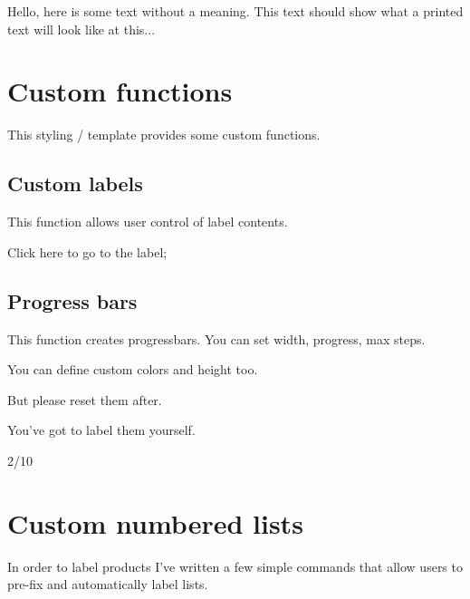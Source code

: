 \documentclass{report}
\begin{document}
	Hello,  here  is  some  text  without  a  meaning.   This  text  should
	show what a printed text will look like at this...
	
	\section{Custom functions}
	This styling / template provides some custom functions. 
	
	\subsection{Custom labels}
	This function allows user control of label contents. 
	
	
	Click here to go to the label;
	
	
	\subsection{Progress bars}
	This function creates progressbars. You can set width, progress, max steps.
	
	
	You can define custom colors and height too. 
	
	\setturbobarheight{10mm}
	
	
	But please reset them after. 
	
	\resetturbobarheight{}
	\resetturbbarcolors{}
	
	You've got to label them yourself.
	
	{2/10}~
	
	\newpage
		
	\section{Custom numbered lists}
	In order to label products I've written a few simple commands that allow users to pre-fix and automatically 
	label lists. 
	
\end{document}
